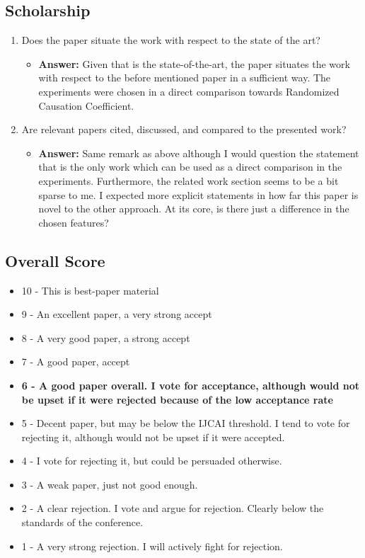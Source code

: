\documentclass[a4paper]{article}
\begin{document}
\subsection{Scholarship}

\begin{enumerate}[label=(\alph*)]
	\item Does the paper situate the work with respect to the state of the art?
		\begin{itemize}
			\item \textbf{Answer:} Given that \cite{lopez2015towards} is the state-of-the-art, the paper situates the work with respect to the before mentioned paper in a sufficient way. The experiments were chosen in a direct comparison towards Randomized Causation Coefficient.
		\end{itemize}			
	
	
	\item Are relevant papers cited, discussed, and compared to the presented work?
		\begin{itemize}
			\item \textbf{Answer:} Same remark as above although I would question the statement that \cite{lopez2015towards} is the only work which can be used as a direct comparison in the experiments. Furthermore, the related work section seems to be a bit sparse to me. I expected more explicit statements in how far this paper is novel to the other approach. At its core, is there just a difference in the chosen features?
		\end{itemize}			
	
\end{enumerate}

\subsection{Overall Score}

\begin{itemize}
	\item 10 - This is best-paper material
	\item 9 - An excellent paper, a very strong accept
	\item 8 - A very good paper, a strong accept
	\item 7 - A good paper, accept
	\item \textbf{6 - A good paper overall. I vote for acceptance, although would not be upset if it were rejected because of the low acceptance rate}
	\item 5 - Decent paper, but may be below the IJCAI threshold. I tend to vote for rejecting it, although would not be upset if it were accepted.
	\item 4 - I vote for rejecting it, but could be persuaded otherwise.
	\item 3 - A weak paper, just not good enough.
	\item 2 - A clear rejection. I vote and argue for rejection. Clearly below the standards of the conference.
	\item 1 - A very strong rejection. I will actively fight for rejection.
\end{itemize}
\end{document}
